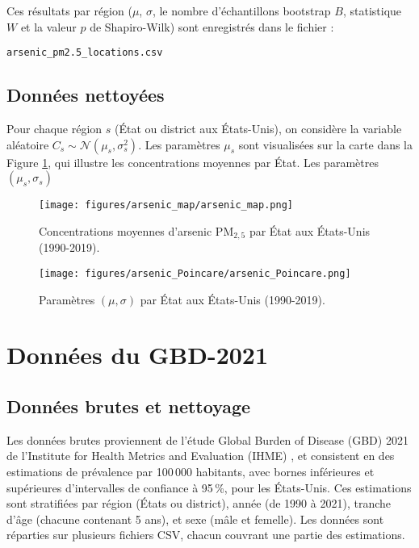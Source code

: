 Ces résultats par région ($\mu$, $\sigma$, le nombre d'échantillons bootstrap $B$, statistique $W$ et la valeur $p$ de Shapiro-Wilk) sont enregistrés dans le fichier :
\begin{center}
	 \texttt{arsenic\_pm2.5\_locations.csv}
\end{center}

\subsection{Données nettoyées}

Pour chaque région $s$ (État ou district aux États-Unis), on considère la variable aléatoire $C_s \sim \mathcal{N}\left(\mu_s, \sigma_s^2 \right)$. Les paramètres $\mu_s$ sont visualisées sur la carte dans la Figure \ref{fig:arsenic-map}, qui illustre les concentrations moyennes par État. Les paramètres $\left(\mu_s, \sigma_s\right)$ 

\begin{figure}[H]
	\centering
	\texttt{[image: figures/arsenic\_map/arsenic\_map.png]}
	\caption{Concentrations moyennes d'arsenic PM$_{2{,}5}$ par État aux États-Unis (1990-2019).}
	\label{fig:arsenic-map}
\end{figure}

\begin{figure}[H]
	\centering
	\texttt{[image: figures/arsenic\_Poincare/arsenic\_Poincare.png]}
	\caption{Paramètres $(\mu, \sigma)$ par État aux États-Unis (1990-2019).}
	\label{fig:arsenic_Poincare}
\end{figure}

\section{Données du GBD-2021} \label{sec:gbd}
\subsection{Données brutes et nettoyage}
Les données brutes proviennent de l'étude Global Burden of Disease (GBD) 2021 de l'Institute for Health Metrics and Evaluation (IHME) \citep{IHME2024GBD}, et consistent en des estimations de prévalence par 100\,000 habitants, avec bornes inférieures et supérieures d'intervalles de confiance à 95\,\%, pour les États-Unis. Ces estimations sont stratifiées par région (États ou district), année (de 1990 à 2021), tranche d'âge (chacune contenant 5 ans), et sexe (mâle et femelle). Les données sont réparties sur plusieurs fichiers CSV, chacun couvrant une partie des estimations.

